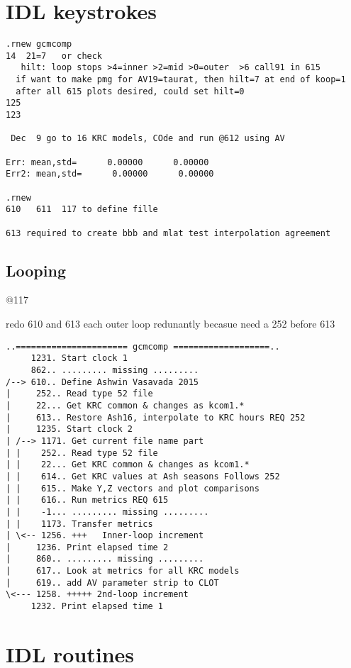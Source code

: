 \documentclass{article}
\begin{document}
\appendix %


\section{IDL keystrokes}
\vspace{-3.mm} 
\begin{verbatim}  
.rnew gcmcomp
14  21=7   or check
   hilt: loop stops >4=inner >2=mid >0=outer  >6 call91 in 615
  if want to make pmg for AV19=taurat, then hilt=7 at end of koop=1
  after all 615 plots desired, could set hilt=0
125
123

 Dec  9 go to 16 KRC models, COde and run @612 using AV 
 
Err: mean,std=      0.00000      0.00000
Err2: mean,std=      0.00000      0.00000

.rnew
610   611  117 to define fille

613 required to create bbb and mlat test interpolation agreement

\end{verbatim}

\subsection{Looping}
@117

redo 610 and 613 each outer loop redunantly becasue need a 252 before 613
\begin{verbatim}
..====================== gcmcomp ===================..
     1231. Start clock 1
     862.. ......... missing .........
/--> 610.. Define Ashwin Vasavada 2015
|     252.. Read type 52 file
|     22... Get KRC common & changes as kcom1.*
|     613.. Restore Ash16, interpolate to KRC hours REQ 252
|     1235. Start clock 2
| /--> 1171. Get current file name part
| |    252.. Read type 52 file
| |    22... Get KRC common & changes as kcom1.*
| |    614.. Get KRC values at Ash seasons Follows 252
| |    615.. Make Y,Z vectors and plot comparisons 
| |    616.. Run metrics REQ 615
| |    -1... ......... missing .........
| |    1173. Transfer metrics
| \<-- 1256. +++   Inner-loop increment
|     1236. Print elapsed time 2 
|     860.. ......... missing .........
|     617.. Look at metrics for all KRC models
|     619.. add AV parameter strip to CLOT
\<--- 1258. +++++ 2nd-loop increment
     1232. Print elapsed time 1
\end{verbatim}


\section{IDL routines}
\end{document}
